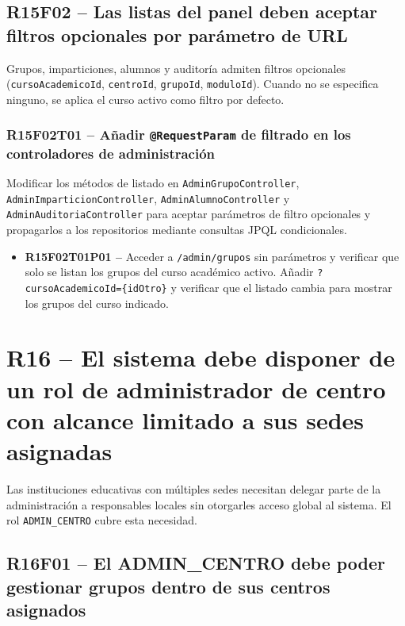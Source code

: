 \documentclass[12pt, a4paper]{report}
\begin{document}
\subsection{R15F02 -- Las listas del panel deben aceptar filtros opcionales por parámetro de URL}

Grupos, imparticiones, alumnos y auditoría admiten filtros opcionales (\texttt{cursoAcademicoId}, \texttt{centroId}, \texttt{grupoId}, \texttt{moduloId}). Cuando no se especifica ninguno, se aplica el curso activo como filtro por defecto.

\subsubsection{R15F02T01 -- Añadir \texttt{@RequestParam} de filtrado en los controladores de administración}
Modificar los métodos de listado en \texttt{AdminGrupoController}, \texttt{AdminImparticionController}, \texttt{AdminAlumnoController} y \texttt{AdminAuditoriaController} para aceptar parámetros de filtro opcionales y propagarlos a los repositorios mediante consultas JPQL condicionales.
\begin{itemize}
  \item \textbf{R15F02T01P01 --} Acceder a \texttt{/admin/grupos} sin parámetros y verificar que solo se listan los grupos del curso académico activo. Añadir \texttt{?cursoAcademicoId=\{idOtro\}} y verificar que el listado cambia para mostrar los grupos del curso indicado.
\end{itemize}

\section{R16 -- El sistema debe disponer de un rol de administrador de centro con alcance limitado a sus sedes asignadas}

Las instituciones educativas con múltiples sedes necesitan delegar parte de la administración a responsables locales sin otorgarles acceso global al sistema. El rol \texttt{ADMIN\_CENTRO} cubre esta necesidad.

\subsection{R16F01 -- El ADMIN\_CENTRO debe poder gestionar grupos dentro de sus centros asignados}
\end{document}
